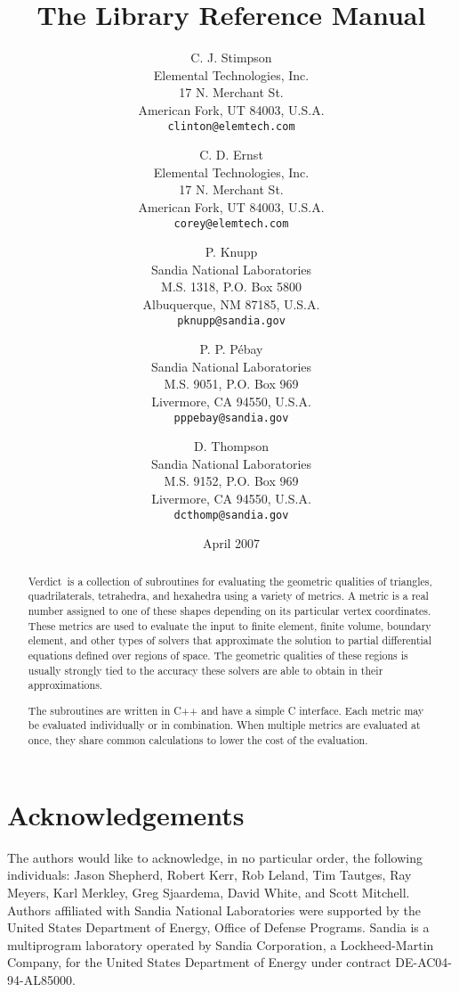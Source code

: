 \documentclass[11pt]{report}
\title{The \verd{} Library Reference Manual}
\author{C. J. Stimpson\\
        Elemental Technologies, Inc.\\
        17 N. Merchant St.\\
        American Fork, UT 84003, U.S.A.\\
        \texttt{clinton@elemtech.com}
        \and
        C. D. Ernst\\
        Elemental Technologies, Inc.\\
        17 N. Merchant St.\\
        American Fork, UT 84003, U.S.A.\\
        \texttt{corey@elemtech.com}
        \and
        P. Knupp\\
        Sandia National Laboratories\\
        M.S. 1318, P.O. Box 5800\\
        Albuquerque, NM 87185, U.S.A.\\
        \texttt{pknupp@sandia.gov}
        \and
        P. P. P\'ebay\\
        Sandia National Laboratories\\
        M.S. 9051, P.O. Box 969\\
        Livermore, CA 94550, U.S.A.\\
        \texttt{pppebay@sandia.gov}
        \and
        D. Thompson\\
        Sandia National Laboratories\\
        M.S. 9152, P.O. Box 969\\
        Livermore, CA 94550, U.S.A.\\
        \texttt{dcthomp@sandia.gov}
}
\date{April 2007}
\newcommand{\verd}{\textsf{Verdict}}
\begin{document}
\maketitle
\begin{abstract}
\verd\ is a collection of subroutines for evaluating the geometric qualities
of triangles, quadrilaterals, tetrahedra, and hexahedra using a variety of
metrics.
A metric is a real number assigned to one of these shapes depending on its
particular vertex coordinates.
These metrics are used to evaluate the input to finite element, finite volume,
boundary element, and other types of solvers that approximate the solution to
partial differential equations defined over regions of space.
The geometric qualities of these regions is usually strongly tied to the
accuracy these solvers are able to obtain in their approximations.

The subroutines are written in C++ and have a simple C interface.
Each metric may be evaluated individually or in combination.
When multiple metrics are evaluated at once, they share common
calculations to lower the cost of the evaluation.
\end{abstract}
\clearpage
\section*{Acknowledgements}
The authors would like to acknowledge, in no particular order, the
following individuals:
Jason Shepherd, Robert Kerr, Rob Leland, Tim Tautges, Ray Meyers, Karl
Merkley, Greg Sjaardema, David White, and Scott Mitchell.\\

Authors affiliated with Sandia National Laboratories were supported by
the United States Department of Energy, Office of Defense
Programs. Sandia is a multiprogram laboratory operated by Sandia
Corporation, a Lockheed-Martin Company, for the United States
Department of Energy under contract DE-AC04-94-AL85000.
\clearpage
\tableofcontents
\listoffigures
\cleardoublepage

\cleardoublepage

\cleardoublepage

\cleardoublepage

\cleardoublepage

\cleardoublepage

\cleardoublepage

\cleardoublepage

\cleardoublepage


\end{document}
